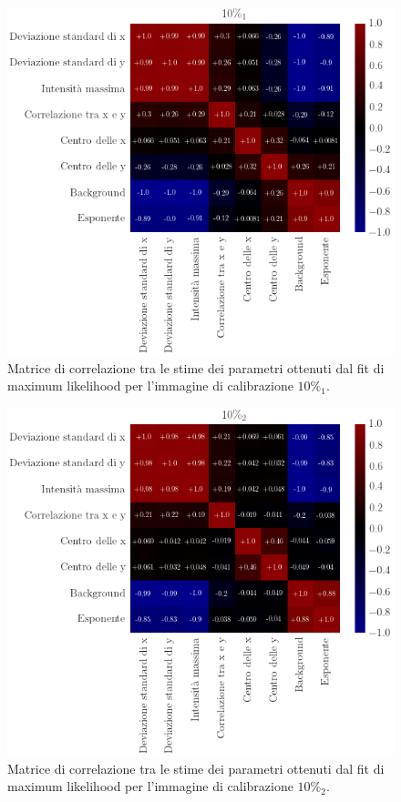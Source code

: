 \begin{figure}
 \centering
 \includegraphics[scale=.45]{img/CAP4c1.png}
 \caption{\small{Matrice di correlazione tra le stime dei parametri ottenuti dal fit di maximum likelihood per l'immagine di calibrazione $10\%_1$.}}
 \label{fig:c1}
\end{figure}

\begin{figure}
 \centering
 \includegraphics[scale=.45]{img/CAP4c2.png}
 \caption{\small{Matrice di correlazione tra le stime dei parametri ottenuti dal fit di maximum likelihood per l'immagine di calibrazione $10\%_2$.}}
 \label{fig:c2}
\end{figure}

